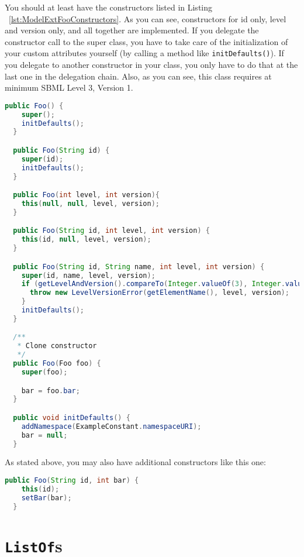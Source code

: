 You should at least have the constructors listed in Listing ~\vref{lst:ModelExtFooConstructors}.
As you can see, constructors for id only, level and version only, and all together are implemented.
If you delegate the constructor call to the super class, you have to take care of the initialization of your custom attributes yourself (by calling a method like \texttt{initDefaults()}).
If you delegate to another constructor in your class, you only have to do that at the last one in the delegation chain.
Also, as you can see, this class requires at minimum SBML Level 3, Version 1.

\begin{lstlisting}[language=Java,caption={Constructors for \texttt{Foo}},label={lst:ModelExtFooConstructors}]
  public Foo() {
    super();
    initDefaults();
  }

  public Foo(String id) {
    super(id);
    initDefaults();
  }

  public Foo(int level, int version){
    this(null, null, level, version);
  }

  public Foo(String id, int level, int version) {
    this(id, null, level, version);
  }

  public Foo(String id, String name, int level, int version) {
    super(id, name, level, version);
    if (getLevelAndVersion().compareTo(Integer.valueOf(3), Integer.valueOf(1)) < 0) {
      throw new LevelVersionError(getElementName(), level, version);
    }
    initDefaults();
  }

  /**
   * Clone constructor
   */
  public Foo(Foo foo) {
    super(foo);

    bar = foo.bar;
  }

  public void initDefaults() {
    addNamespace(ExampleConstant.namespaceURI);
    bar = null;
  }
\end{lstlisting}

As stated above, you may also have additional constructors like this one:
\begin{lstlisting}[language=Java,caption={Additional constructor for \texttt{Foo}},label={lst:ModelExtFooConstructorsAdditional}]
  public Foo(String id, int bar) {
    this(id);
    setBar(bar);
  }
\end{lstlisting}



\section{\texttt{ListOf}s}

